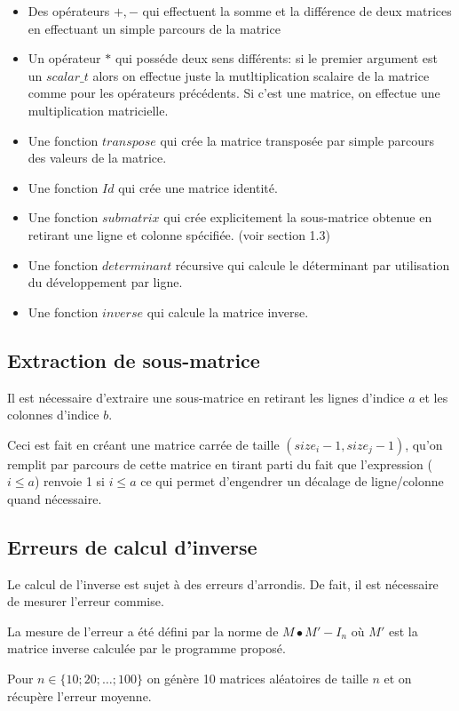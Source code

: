 \documentclass[a4paper,11pt]{article}
\begin{document}
\begin{itemize}
\item Des opérateurs $+,-$ qui effectuent la somme et la différence de deux matrices en effectuant un simple parcours de la matrice
\item Un opérateur $*$ qui posséde deux sens différents: si le premier argument est un $scalar\_t$ alors on effectue juste la mutltiplication scalaire de la matrice comme pour les opérateurs précédents. Si c'est une matrice, on effectue une multiplication matricielle.
\item Une fonction $transpose$ qui crée la matrice transposée par simple parcours des valeurs de la matrice.
\item Une fonction $Id$ qui crée une matrice identité.
\item Une fonction $submatrix$ qui crée explicitement la sous-matrice obtenue en retirant une ligne et colonne spécifiée. (voir section 1.3)
\item Une fonction $determinant$ récursive qui calcule le déterminant par utilisation du développement par ligne.
\item Une fonction $inverse$ qui calcule la matrice inverse.
\end{itemize}

\subsection{Extraction de sous-matrice}

Il est nécessaire d'extraire une sous-matrice en retirant les lignes d'indice $a$ et les colonnes d'indice $b$. 

Ceci est fait en créant une matrice carrée de taille $(size_i-1, size_j-1)$, qu'on remplit par parcours de cette matrice en tirant parti du fait que l'expression
($i \leq a$) renvoie 1 si $i \leq a$ ce qui permet d'engendrer un décalage de ligne/colonne quand nécessaire.

\subsection{Erreurs de calcul d'inverse}

Le calcul de l'inverse est sujet à des erreurs d'arrondis. De fait, il est nécessaire de mesurer l'erreur commise.

La mesure de l'erreur a été défini par la norme de $M\bullet M' - I_n$ où $M'$ est la matrice inverse calculée par le programme proposé.

Pour $n \in \{10;20;\dots;100\}$ on génère 10 matrices aléatoires de taille $n$ et on récupère l'erreur moyenne.
\end{document}

